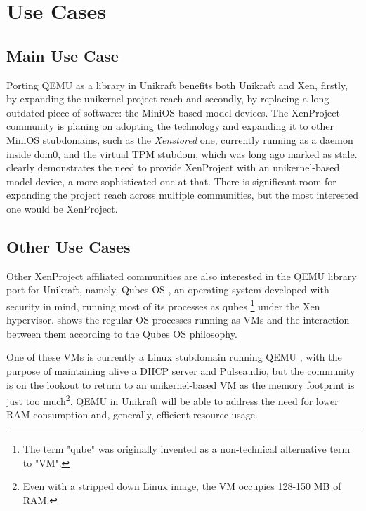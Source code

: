 \chapter{Use Cases}
\label{chapter:use-cases}

\section{Main Use Case}
\label{sec:main-use-case}

Porting QEMU as a library in Unikraft benefits both Unikraft and Xen, firstly, by expanding the unikernel project reach and secondly, by replacing a long outdated piece of software: the MiniOS-based model devices.
The XenProject community is planing on adopting the technology and expanding it to other MiniOS stubdomains, such as the \textit{Xenstored} one, currently running as a daemon inside dom0, and the virtual TPM stubdom, which was long ago marked as stale.
 clearly demonstrates the need to provide XenProject with an unikernel-based model device, a more sophisticated one at that.
There is significant room for expanding the project reach across multiple communities, but the most interested one would be XenProject.


\section{Other Use Cases}
\label{sec:other-use-cases}

Other XenProject affiliated communities are also interested in the QEMU library port for Unikraft, namely, Qubes OS \cite{qubes-os}, an operating system developed with security in mind, running most of its processes as qubes \footnote{The term "qube" was originally invented as a non-technical alternative term to "VM".} under the Xen hypervisor.
 shows the regular OS processes running as VMs and the interaction between them according to the Qubes OS philosophy.


One of these VMs is currently a Linux stubdomain running QEMU \cite{qubes-os-linux-stubdom}, with the purpose of maintaining alive a DHCP server and Pulseaudio, but the community is on the lookout to return to an unikernel-based VM as the memory footprint is just too much\footnote{Even with a stripped down Linux image, the VM occupies 128-150 MB of RAM.}.
QEMU in Unikraft will be able to address the need for lower RAM consumption and, generally, efficient resource usage.

